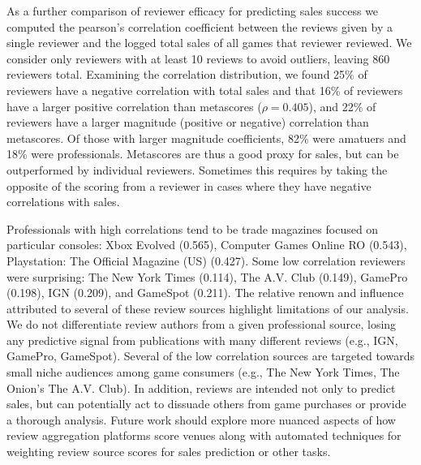 \documentclass[letterpaper]{article}
\begin{document}
As a further comparison of reviewer efficacy for predicting sales success we computed the pearson's correlation coefficient between the reviews given by a single reviewer and the logged total sales of all games that reviewer reviewed. We consider only reviewers with at least 10 reviews to avoid outliers, leaving 860 reviewers total. Examining the correlation distribution, we found 25\% of reviewers have a negative correlation with total sales and that 16\% of reviewers have a larger positive correlation than metascores ($\rho = 0.405$), and 22\% of reviewers have a larger magnitude (positive or negative) correlation than metascores. Of those with larger magnitude coefficients, 82\% were amatuers and 18\% were professionals. Metascores are thus a good proxy for sales, but can be outperformed by individual reviewers. Sometimes this requires by taking the opposite of the scoring from a reviewer in cases where they have negative correlations with sales.

Professionals with high correlations tend to be trade magazines focused on particular consoles: Xbox Evolved (0.565), Computer Games Online RO (0.543), %
Playstation: The Official Magazine (US) (0.427).
Some low correlation reviewers were surprising: The New York Times (0.114), The A.V. Club (0.149), 
GamePro (0.198), IGN (0.209), and GameSpot (0.211). %
The relative renown and influence attributed to several of these review sources highlight limitations of our analysis. We do not differentiate review authors from a given professional source, losing any predictive signal from publications with many different reviews (e.g., IGN, GamePro, GameSpot). Several of the low correlation sources are targeted towards small niche audiences among game consumers (e.g., The New York Times, The Onion's The A.V. Club). In addition, reviews are intended not only to predict sales, but can potentially act to dissuade others from game purchases or provide a thorough analysis. Future work should explore more nuanced aspects of how review aggregation platforms score venues along with automated techniques for weighting review source scores for sales prediction or other tasks.
\end{document}
